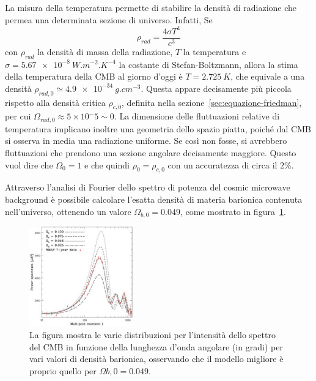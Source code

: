 La misura della temperatura permette di stabilire la densità di radiazione che permea una determinata sezione di universo. Infatti, Se
\[
    \rho_{rad} = \frac{4\sigma T^4}{c^3}
\]
con $\rho_{rad}$ la densità di massa della radiazione, $T$ la temperatura e $\sigma = \SI{5.67e-8}{W.m^{-2}.K^{-4}}$ la costante di Stefan-Boltzmann, allora la stima della temperatura della CMB al giorno d'oggi è $T=\SI{2.725}{K}$, che equivale a una densità $\rho_{rad, 0} \simeq \SI{4.9e-34}{g.cm^{-3}}$. Questa appare decisamente più piccola rispetto alla densità critica $\rho_{c,0}$, definita nella sezione~\ref{sec:equazione-friedman}, per cui $\Omega_{rad,0} \approx 5\times 10^-5 \sim 0$. La dimensione delle fluttuazioni relative di temperatura implicano inoltre una geometria dello spazio piatta, poiché dal CMB si osserva in media una radiazione uniforme. Se così non fosse, si avrebbero fluttuazioni che prendono una sezione angolare decisamente maggiore. Questo vuol dire che $\Omega_0 = 1$ e che quindi $\rho_0 = \rho_{c,0}$ con un accuratezza di circa il $2\%$.

Attraverso l'analisi di Fourier dello spettro di potenza del cosmic microwave background è possibile calcolare l'esatta densità di materia barionica contenuta nell'universo, ottenendo un valore $\Omega_{b,0} = 0.049$, come mostrato in figura~\ref{fig:baryon}.
\begin{figure}
    \centering
    \includegraphics[width=0.4\textwidth]{immagini/barioni.jpg}
    \caption{La figura mostra le varie distribuzioni per l'intensità dello spettro del CMB in funzione della lunghezza d'onda angolare (in gradi) per vari valori di densità barionica, osservando che il modello migliore è proprio quello per $\Omega{b,0} = 0.049$.}\label{fig:baryon}
\end{figure}

